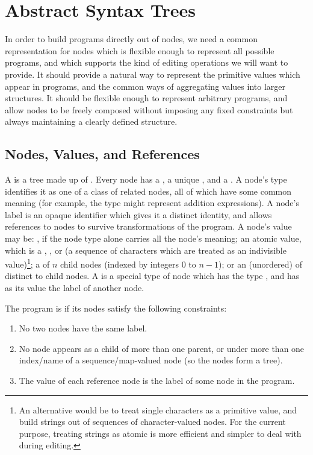 \chapter{Abstract Syntax Trees}
\label{ASTs}
In order to build programs directly out of nodes, we need a common representation for nodes which is flexible enough to represent all possible programs, and which supports the kind of editing operations we will want to provide. It should provide a natural way to represent the primitive values which appear in programs, and the common ways of aggregating values into larger structures. It should be flexible enough to represent arbitrary programs, and allow nodes to be freely composed without imposing any fixed constraints but always maintaining a clearly defined structure.


\section{Nodes, Values, and References}
A  is a tree made up of . Every node has a , a unique , and a . A node's type identifies it as one of a class of related nodes, all of which have some common meaning (for example, the type  might represent addition expressions). A node's label is an opaque identifier which gives it a distinct identity, and allows references to nodes to survive transformations of the program. A node's value may be: , if the node type alone carries all the node's meaning; an atomic value, which is a , , or  (a sequence of characters which are treated as an indivisible value)\footnote{An alternative would be to treat single characters as a primitive value, and build strings out of sequences of character-valued nodes. For the current purpose, treating strings as atomic is more efficient and simpler to deal with during editing.}; a  of $n$ child nodes (indexed by integers $0$ to $n-1$); or an (unordered)  of distinct  to child nodes. A  is a special type of node which has the type , and has as its value the label of another node.

The program is  if its nodes satisfy the following constraints:
\begin{enumerate}
\item No two nodes have the same label.
\item No node appears as a child of more than one parent, or under more than one index/name of a sequence/map-valued node (so the nodes form a tree).
\item The value of each reference node is the label of some node in the program.
\end{enumerate}


